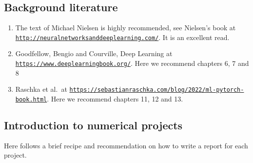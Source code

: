 \documentclass[%
oneside,                 %
final,                   %
10pt]{article}
\begin{document}
\subsection*{Background literature}

\begin{enumerate}
\item The text of Michael Nielsen is highly recommended, see Nielsen's book at \href{{http://neuralnetworksanddeeplearning.com/}}{\nolinkurl{http://neuralnetworksanddeeplearning.com/}}. It is an excellent read.

\item Goodfellow, Bengio and Courville, Deep Learning at \href{{https://www.deeplearningbook.org/}}{\nolinkurl{https://www.deeplearningbook.org/}}. Here we recommend chapters 6, 7 and 8

\item Raschka et al.~at \href{{https://sebastianraschka.com/blog/2022/ml-pytorch-book.html}}{\nolinkurl{https://sebastianraschka.com/blog/2022/ml-pytorch-book.html}}. Here we recommend chapters 11, 12 and 13.
\end{enumerate}

\noindent
\subsection*{Introduction to numerical projects}

Here follows a brief recipe and recommendation on how to write a report for each
project.
\end{document}

